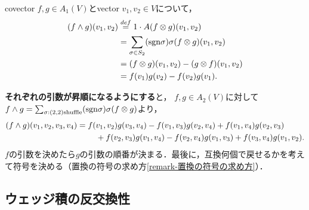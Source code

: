 \documentclass[uplatex,dvipdfmx]{jsreport}
\begin{document}
\begin{example}
    covector $f,g\in A_1(V)$とvector $v_1,v_2\in V$について，
    \begin{align*}
        (f\wedge g)(v_1,v_2)&\overset{def}{=}1\cdot A(f\otimes g)(v_1,v_2)\\
        &=\sum_{\sigma\in S_2}(\mathrm{sgn}\sigma)\sigma(f\otimes g)(v_1,v_2)\\
        &=(f\otimes g)(v_1,v_2)-(g\otimes f)(v_1,v_2)\\
        &=f(v_1)g(v_2)-f(v_2)g(v_1).
    \end{align*}
\end{example}

\begin{example}[2-covectorのwedge積をshuffleで見る]
    \textbf{それぞれの引数が昇順になるようにする}と，
    $f,g\in A_2(V)$に対して$f\wedge g=\sum_{\sigma:(2,2)\mathrm{shuffle}}(\mathrm{sgn}\sigma)\sigma(f\otimes g)$より，
    \begin{align*}
        (f\wedge g)(v_1,v_2,v_3,v_4)&=f(v_1,v_2)g(v_3,v_4)-f(v_1,v_3)g(v_2,v_4)+f(v_1,v_4)g(v_2,v_3)\\
        &\hphantom{===}+f(v_2,v_3)g(v_1,v_4)-f(v_2,v_4)g(v_1,v_3)+f(v_3,v_4)g(v_1,v_2).
    \end{align*}
    $f$の引数を決めたら$g$の引数の順番が決まる．最後に，互換何個で戻せるかを考えて符号を決める（置換の符号の求め方\ref{remark-置換の符号の求め方}）．
\end{example}

\subsection{ウェッジ積の反交換性}

\begin{tcolorbox}[colframe=ForestGreen, colback=ForestGreen!10!white, breakable ,colbacktitle=ForestGreen!40!white, coltitle=black,fonttitle=\bfseries\sffamily,
    title=全体のポイント]
    
\end{tcolorbox}
\end{document}
